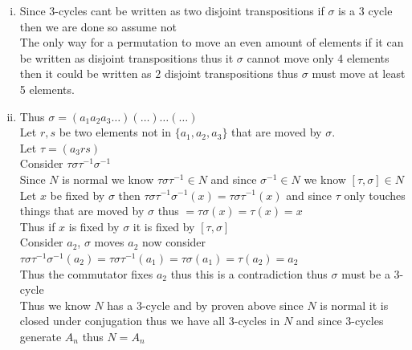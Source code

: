 \documentclass[12pt, letterpaper]{article}
\theoremstyle{definition}
\begin{document}
\begin{enumerate}[(a)]
\begin{enumerate}[i.]
        Let $r \in \{1,\dots,n\}$ s.t. $r$ is fixed in $\sigma$\\
        Let $\tau=(a_1b_1r)$\\
        Consider $\tau\sigma\tau^{-1}\sigma^{-1}$\\
        Since $N$ is normal we know $\tau\sigma\tau^{-1} \in N$ and since $\sigma^{-1} \in N$ we know $[\tau, \sigma] \in N$\\
        $=\tau(a_1b_1)\tau^{-1}\tau(a_2b_2)\tau^{-1}\dots\tau(a_tb_t)\tau^{-1}\sigma$\\
        $=(b_1r)(a_2b_2)\dots(a_tb_t)\sigma$\\
        $=(b_1r)(a_1b_1)=(a_1rb_1)$\\
        Thus $[\tau, \sigma]$ fixes $n-3$ points\\
        $n-2t \leq n-4 < n-3$ thus the commutator fixes more points and is not the identity, thus $\sigma$ cannot be written as disjoint transpositions.
        \item Since 3-cycles cant be written as two disjoint transpositions if $\sigma$ is a 3 cycle then we are done so assume not\\
        The only way for a permutation to move an even amount of elements if it can be written as disjoint transpositions thus it $\sigma$ cannot move only 4 elements then it could
        be written as $2$ disjoint transpositions thus $\sigma$ must move at least 5 elements.
        \item Thus $\sigma=(a_1a_2a_3\dots)(\dots)\dots(\dots)$\\
        Let $r,s$ be two elements not in $\{a_1,a_2,a_3\}$ that are moved by $\sigma$.\\ 
        Let $\tau = (a_3rs)$\\
        Consider $\tau\sigma\tau^{-1}\sigma^{-1}$\\
        Since $N$ is normal we know $\tau\sigma\tau^{-1} \in N$ and since $\sigma^{-1} \in N$ we know $[\tau, \sigma] \in N$\\
        Let $x$ be fixed by $\sigma$ then $\tau\sigma\tau^{-1}\sigma^{-1}(x)=\tau\sigma\tau^{-1}(x)$ and since $\tau$ only touches things that are moved by $\sigma$ thus $=\tau\sigma(x)=\tau(x)=x$\\
        Thus if $x$ is fixed by $\sigma$ it is fixed by $[\tau, \sigma]$\\
        Consider $a_2$, $\sigma$ moves $a_2$ now consider $\tau\sigma\tau^{-1}\sigma^{-1}(a_2)=\tau\sigma\tau^{-1}(a_1)=\tau\sigma(a_1)=\tau(a_2)=a_2$\\
        Thus the commutator fixes $a_2$ thus this is a contradiction thus $\sigma$ must be a 3-cycle\\
        Thus we know $N$ has a 3-cycle and by proven above since $N$ is normal it is closed under conjugation thus we have all 3-cycles in $N$ and since 3-cycles generate $A_n$ thus $N=A_n$
    \end{enumerate}
\end{enumerate}
\end{document}
